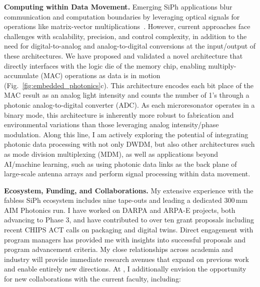 \textbf{Computing within Data Movement.} Emerging SiPh applications blur communication and computation boundaries by leveraging optical signals for operations like matrix-vector multiplications~\cite{taitMicroringWeightBanks2016,shenDeepLearningCoherent2017}. However, current approaches face challenges with scalability, precision, and control complexity, in addition to the need for digital-to-analog and analog-to-digital conversions at the input/output of these architectures. We have proposed and validated a novel architecture that directly interfaces with the logic die of the memory chip, enabling multiply-accumulate (MAC) operations as data is in motion (Fig.~\ref{fig:embedded_photonics}c). This architecture encodes each bit place of the MAC result as an analog light intensity and counts the number of 1's through a photonic analog-to-digital converter (ADC). As each microresonator operates in a binary mode, this architecture is inherently more robust to fabrication and environmental variations than those leveraging analog intensity/phase modulation. Along this line, I am actively exploring the potential of integrating photonic data processing with not only DWDM, but also other architectures such as mode division multiplexing (MDM), as well as applications beyond AI/machine learning, such as using photonic data links as the back plane of large-scale antenna arrays and perform signal processing within data movement.

\textbf{Ecosystem, Funding, and Collaborations.} My extensive experience with the fabless SiPh ecosystem includes nine tape-outs and leading a dedicated 300\,mm AIM Photonics run. I have worked on DARPA and ARPA-E projects, both advancing to Phase 3, and have contributed to over ten grant proposals including recent CHIPS ACT calls on packaging and digital twins. Direct engagement with program managers has provided me with insights into successful proposals and program advancement criteria. My close relationships across academia and industry will provide immediate research avenues that expand on previous work and enable entirely new directions. At \appSchoolDeptShort{}, I additionally envision the opportunity for new collaborations with the current faculty, including:
\begin{enumerate*}[label=(\roman*)]
    \appCollab{}
\end{enumerate*}